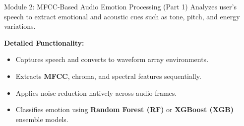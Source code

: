 \documentclass{beamer}
\begin{document}
\begin{frame}{Module 2: MFCC-Based Audio Emotion Processing (Part 1)}
Analyzes user’s speech to extract emotional and acoustic cues such as tone, pitch, and energy variations.

\vspace{0.3cm}
\textbf{Detailed Functionality:}
\begin{itemize}
    \item Captures speech and converts to waveform array environments.
    \item Extracts \textbf{MFCC}, chroma, and spectral features sequentially.
    \item Applies noise reduction natively across audio frames.
    \item Classifies emotion using \textbf{Random Forest (RF)} or \textbf{XGBoost (XGB)} ensemble models.
\end{itemize}
\end{frame}
\end{document}
